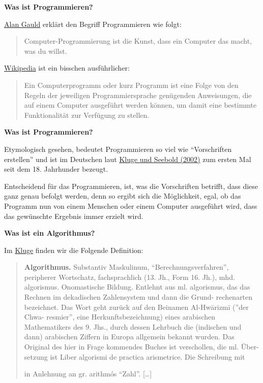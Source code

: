 \par\noindent\textbf{Was ist Programmieren?}

\href{http://www.freenetpages.co.uk/hp/alan.gauld/german/tutwhat.htm}{Alan
Gauld} erklärt den Begriff Programmieren wie folgt:

\begin{quote}
Computer-Programmierung ist die Kunst, dass ein Computer das macht, was
du willst.
\end{quote}

{\href{http://de.wikipedia.org/wiki/Computerprogramm}{Wikipedia} ist ein
bisschen ausführlicher:}

\begin{quote}
Ein Computerprogramm oder kurz Programm ist eine Folge von den Regeln
der jeweiligen Programmiersprache genügenden Anweisungen, die auf einem
Computer ausgeführt werden können, um damit eine bestimmte
Funktionalität zur Verfügung zu stellen.
\end{quote}



\par\noindent\textbf{Was ist Programmieren?}

Etymologisch gesehen, bedeutet Programmieren so viel wie ``Vorschriften
erstellen'' und ist im Deutschen laut
\href{http://bibliography.lingpy.org?key=Kluge2002}{Kluge und Seebold
(2002)} zum ersten Mal seit dem 18. Jahrhunder bezeugt.

Entscheidend für das Programmieren, ist, was die Vorschriften betrifft,
dass diese ganz genau befolgt werden, denn so ergibt sich die
Möglichkeit, egal, ob das Programm nun von einem Menschen oder einem
Computer ausgeführt wird, dass das gewünschte Ergebnis immer erzielt
wird.



\par\noindent\textbf{Was ist ein Algorithmus?}

{Im \href{http://bibliography.lingpy.org?key=Kluge2002}{Kluge} finden
wir die Folgende Definition:}

\begin{quote}
\par\noindent\textbf{Algorithmus.} Substantiv Maskulinum, ``Berechnungsverfahren'',
peripherer Wortschatz, fachsprachlich (13. Jh., Form 16. Jh.), mhd.
algorismus. Onomastische Bildung. Entlehnt aus ml. algorismus, das das
Rechnen im dekadischen Zahlensystem und dann die Grund- rechenarten
bezeichnet. Das Wort geht zurück auf den Beinamen Al-Hwārizmī (''der
Chwa- resmier'', eine Herkunftsbezeichnung) eines arabischen
Mathematikers des 9. Jhs., durch dessen Lehrbuch die (indischen und
dann) arabischen Ziffern in Europa allgemein bekannt wurden. Das
Original des hier in Frage kommendes Buches ist verschollen, die ml.
Über- setzung ist Liber algorismi de practica arismetrice. Die
Schreibung mit

in Anlehnung an gr. arithmós ``Zahl''. {[}\ldots{}{]}
\end{quote}



